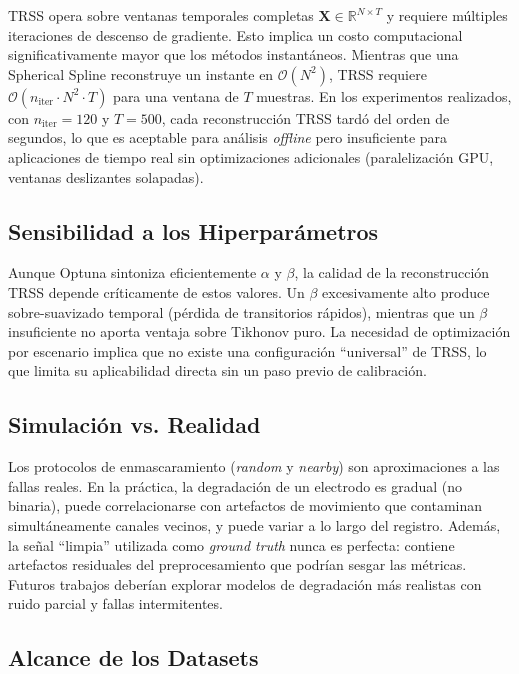 TRSS opera sobre ventanas temporales completas $\mathbf{X} \in \mathbb{R}^{N \times T}$ y requiere múltiples iteraciones de descenso de gradiente. Esto implica un costo computacional significativamente mayor que los métodos instantáneos. Mientras que una Spherical Spline reconstruye un instante en $\mathcal{O}(N^2)$, TRSS requiere $\mathcal{O}(n_{\text{iter}} \cdot N^2 \cdot T)$ para una ventana de $T$ muestras. En los experimentos realizados, con $n_{\text{iter}} = 120$ y $T = 500$, cada reconstrucción TRSS tardó del orden de segundos, lo que es aceptable para análisis \textit{offline} pero insuficiente para aplicaciones de tiempo real sin optimizaciones adicionales (paralelización GPU, ventanas deslizantes solapadas).

\subsection{Sensibilidad a los Hiperparámetros}

Aunque Optuna sintoniza eficientemente $\alpha$ y $\beta$, la calidad de la reconstrucción TRSS depende críticamente de estos valores. Un $\beta$ excesivamente alto produce sobre-suavizado temporal (pérdida de transitorios rápidos), mientras que un $\beta$ insuficiente no aporta ventaja sobre Tikhonov puro. La necesidad de optimización por escenario implica que no existe una configuración ``universal'' de TRSS, lo que limita su aplicabilidad directa sin un paso previo de calibración.

\subsection{Simulación vs. Realidad}

Los protocolos de enmascaramiento (\textit{random} y \textit{nearby}) son aproximaciones a las fallas reales. En la práctica, la degradación de un electrodo es gradual (no binaria), puede correlacionarse con artefactos de movimiento que contaminan simultáneamente canales vecinos, y puede variar a lo largo del registro. Además, la señal ``limpia'' utilizada como \textit{ground truth} nunca es perfecta: contiene artefactos residuales del preprocesamiento que podrían sesgar las métricas. Futuros trabajos deberían explorar modelos de degradación más realistas con ruido parcial y fallas intermitentes.

\subsection{Alcance de los Datasets}

